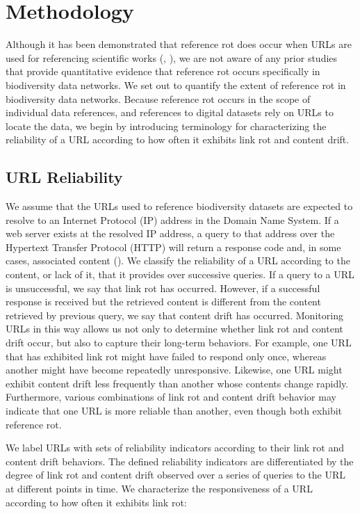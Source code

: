 \documentclass[10pt,letterpaper]{article}
\begin{document}
\section*{Methodology}

Although it has been demonstrated that reference rot does occur when URLs are used for referencing scientific works (\cite{Vision_2010}, \cite{Klein_2014}), we are not aware of any prior studies that provide quantitative evidence that reference rot occurs specifically in biodiversity data networks. We set out to quantify the extent of reference rot in biodiversity data networks. Because reference rot occurs in the scope of individual data references, and references to digital datasets rely on URLs to locate the data, we begin by introducing terminology for characterizing the reliability of a URL according to how often it exhibits link rot and content drift.

\subsection*{URL Reliability}
We assume that the URLs used to reference biodiversity datasets are expected to resolve to an Internet Protocol (IP) address in the Domain Name System. If a web server exists at the resolved IP address, a query to that address over the Hypertext Transfer Protocol (HTTP) will return a response code and, in some cases, associated content (\cite{rfc3986}).  We classify the reliability of a URL according to the content, or lack of it, that it provides over successive queries. If a query to a URL is unsuccessful, we say that link rot has occurred. However, if a successful response is received but the retrieved content is different from the content retrieved by previous query, we say that content drift has occurred. Monitoring URLs in this way allows us not only to determine whether link rot and content drift occur, but also to capture their long-term behaviors. For example, one URL that has exhibited link rot might have failed to respond only once, whereas another might have become repeatedly unresponsive. Likewise, one URL might exhibit content drift less frequently than another whose contents change rapidly. Furthermore, various combinations of link rot and content drift behavior may indicate that one URL is more reliable than another, even though both exhibit reference rot.

We label URLs with sets of reliability indicators according to their link rot and content drift behaviors. The defined reliability indicators are differentiated by the degree of link rot and content drift observed over a series of queries to the URL at different points in time. We characterize the responsiveness of a URL according to how often it exhibits link rot: 
\end{document}
